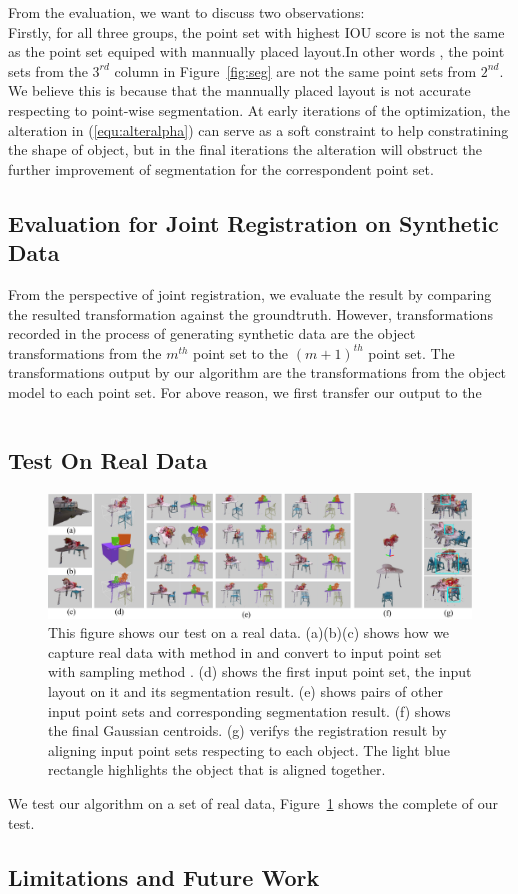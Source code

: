 From the evaluation, we want to discuss two observations:\\
Firstly, for all three groups, the point set with highest IOU score is not the same as the point set equiped with mannually placed layout.In other words , the point sets from the $3^{rd}$ column in Figure~\ref{fig:seg} are not the same point sets from $2^{nd}$. We believe this is because that the mannually placed layout is not accurate respecting to point-wise segmentation. At early iterations of the optimization, the alteration in (\ref{equ:alteralpha}) can serve as a soft constraint to help constratining the shape of object, but in the final iterations the alteration will obstruct the further improvement of segmentation for the correspondent point set. 
\subsection{Evaluation for Joint Registration on Synthetic Data}
From the perspective of joint registration, we evaluate the result by comparing the resulted transformation against the groundtruth. However, transformations recorded in the process of generating synthetic data are the object transformations from the $m^{th}$ point set to the $(m+1)^{th}$ point set. The transformations output by our algorithm are the transformations from the object model to each point set. For above reason, we first transfer our output to the  
\begin{table}[!hbp]
\centering
\begin{tabular}{c l}
		\hline
\end{tabular}
\end{table}
\subsection{Test On Real Data}
\begin{figure}[htb]
	\centering
	\includegraphics[width=\linewidth]{images/realdata/realdata}
	\caption{\label{fig:realdata}This figure shows our test on a real data. (a)(b)(c) shows how we capture real data with method in \cite{VXH} and convert to input point set with sampling method \cite{PossionSampling}. (d) shows the first input point set, the input layout on it and its segmentation result. (e) shows pairs of other input point sets and corresponding segmentation result. (f) shows the final Gaussian centroids. (g) verifys the registration result by aligning input point sets respecting to each object. The light blue rectangle highlights the object that is aligned together. }
\end{figure}
We test our algorithm on a set of real data, Figure~{\ref{fig:realdata}} shows the complete of our test. 
\subsection{Limitations and Future Work}
